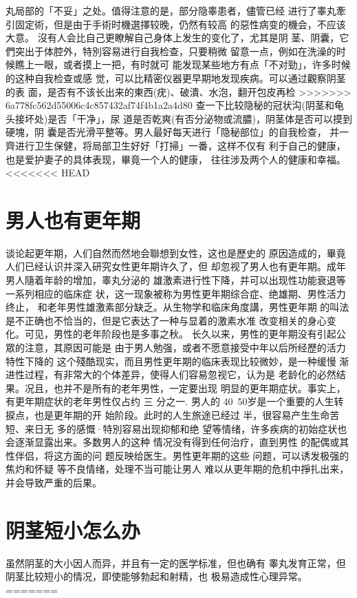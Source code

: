 \documentclass[12pt,UTF8]{ctexbook}
\begin{document}
丸局部的「不妥」之处。值得注意的是，部分隐睾患者，儘管已经
进行了睾丸牽引固定術，但是由于手術时機選擇较晚，仍然有较高
的惡性病变的機会，不应该大意。
沒有人会比自己更瞭解自己身体上发生的变化了，尤其是阴
茎、阴囊，它們突出于体腔外，特別容易进行自我检查，只要稍微
留意一点，例如在洗澡的时候瞧上一眼，或者摸上一把，有时就可
能发现某些地方有点「不对勁」，许多时候的这种自我检查或感
觉，可以比精密仪器更早期地发现疾病。可以通过觀察阴茎的表
面，是否有不该长出来的東西(疣)、破潰、水泡，翻开包皮再检
>>>>>>> 6a778fc562d55006c4c857432af74f4b1a2a4d80
查一下比较隐秘的冠状沟(阴茎和龟头接坏处)是否「干净」，尿
道是否乾爽(有否分泌物或流膿)，阴茎体是否可以摸到硬塊，阴
囊是否光滑平整等。男人最好每天进行「隐秘部位」的自我检查，
并一齊进行卫生保健，将局部卫生好好「打掃」一番，这样不仅有
利于自己的健康，也是爱护妻子的具体表现，畢竟一个人的健康，
往往涉及两个人的健康和幸福。
<<<<<<< HEAD

\section{男人也有更年期}
谈论起更年期，人们自然而然地会聯想到女性，这也是歷史的
原因造成的，畢竟人们已经认识并深入研究女性更年期许久了，但
却忽视了男人也有更年期。成年男人隨着年龄的增加，睾丸分泌的
雄激素进行性下降，并可以出现性功能衰退等一系列相应的临床症
状，这一现象被称为男性更年期综合症、绝雄期、男性活力终止，
和老年男性雄激素部分缺乏。从生物学和临床角度講，男性更年期
的叫法是不正确也不恰当的，但是它表达了一种与显着的激素水准
改变相关的身心变化。可见，男性的老年阶段也是多事之秋。
长久以来，男性的更年期没有引起公眾的注意，其原因可能是
由于男人勉强，或者不愿意接受中年以后所经歷的活力特性下降的
这个殘酷现实，而且男性更年期的临床表现比较微妙，是一种缓慢
渐进性过程，有非常大的个体差异，使得人们容易忽视它，认为是
老龄化的必然结果。况且，也并不是所有的老年男性，一定要出现
明显的更年期症状。事实上，有更年期症状的老年男性仅占约 三
分之一.
男人的 40~50岁是一个重要的人生转捩点，也是更年期的开
始阶段。此时的人生旅途已经过
半，很容易产生生命苦短、来日无
多的感慨·特別容易出现抑郁和绝
望等情绪，许多疾病的初始症状也
会逐渐显露出来。多数男人的这种
情况没有得到任何治疗，直到男性
的配偶或其性伴侣，将这方面的问
题反映给医生。男性更年期的这些
问题，可以诱发极强的焦灼和怀疑
等不良情绪，处理不当可能让男人
难以从更年期的危机中掙扎出来，
并会导致严重的后果。

\section{阴茎短小怎么办}
虽然阴茎的大小因人而异，并且有一定的医学标准，但也确有
睾丸发育正常，但阴茎比较短小的情况，即使能够勃起和射精，也
极易造成性心理异常。
=======
\end{document}
